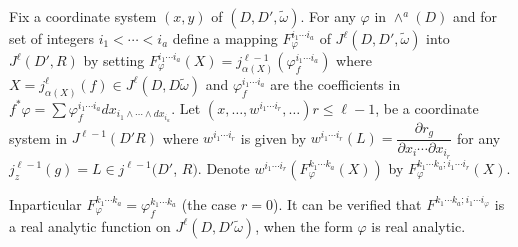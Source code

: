 Fix a coordinate system $(x, y)$ of $(D, D' , \tilde{\omega})$. For
any $\varphi$ in $\wedge^a (D)$ and for set of integers $i_1 < \cdots
< i_a$ define a mapping $F^{i_1 \cdots i_a}_\varphi$ of $J^\ell (D, D'
, \tilde{\omega})$ into $J^\ell (D', R)$ by setting $F^{i_1 \cdots
  i_a}_\varphi (X) = j^{\ell - 1}_{\alpha (X)} (\varphi^{i_1 \cdots
  i_a}_f)$ where $X = j^{\ell}_{\alpha (X)} (f) \in J^\ell (D, D
\tilde{\omega})$ and $\varphi^{i_1 \cdots i_a}_f$ are the coefficients
in $f^* \varphi = \sum \varphi^{i_1 \cdots i_a}_f dx_{i_1 \wedge
  \cdots \wedge dx_{i_a}}$. Let $(x, \ldots ,w^{i_1 \cdots i_r}, \ldots) r
\leq \ell - 1$, be a coordinate system in $J^{\ell -1} (D' R)$ where
$w^{i_1 \cdots i_r}$ is given by $w^{i_1 \cdots i_r} (L) =
\dfrac{\partial r_g}{\partial x_i \cdots \partial x_{i_r}}$ for any
$j^{\ell -1 }_z (g) = L \in j^{\ell - 1} (D'$, $R)$. Denote $w^{i_1
  \cdots i_r} (F^{k_1 \cdots k_a}_\varphi (X))$ by
$F^{k_1\cdots k_a ; i_1 \cdots i_r}_\varphi (X)$. 

In\pageoriginale particular $F^{k_ 1\cdots k_a}_{\varphi} = \varphi^{k_ 1\cdots k_a
}_f$ (the case $r = 0$). It can be verified that $F^{k_ 1\cdots k_a ;
  i_1 \cdots i_\varphi}$ is a real analytic function on $J^\ell (D, D'
\tilde{\omega})$, when the form $\varphi$ is real analytic. 

